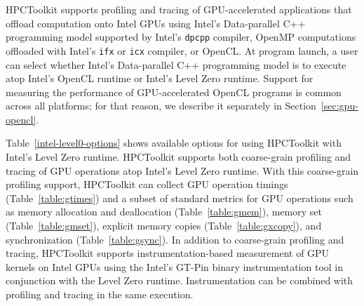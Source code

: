 
HPCToolkit supports profiling and tracing of GPU-accelerated  applications that offload computation onto Intel GPUs using  Intel's Data-parallel C++ programming model supported by Intel's {\tt dpcpp} compiler, OpenMP computations offloaded with Intel's {\tt ifx} or {\tt icx} compiler, or OpenCL. At program launch, a user can select whether Intel's Data-parallel C++ programming model is to execute atop Intel's OpenCL runtime or Intel's Level Zero runtime. Support for measuring the performance of GPU-accelerated OpenCL programs is common across all platforms; for that reason, we describe it separately in Section~\ref{sec:gpu-opencl}.

Table~\ref{intel-level0-options} shows available options for using HPCToolkit with Intel's Level Zero runtime. HPCToolkit supports both coarse-grain profiling and tracing of GPU operations atop Intel's Level Zero runtime. With this coarse-grain profiling support, HPCToolkit can collect GPU operation timings (Table~\ref{table:gtimes}) and a subset of standard metrics for GPU operations such as memory allocation and deallocation (Table~\ref{table:gmem}), memory set (Table~\ref{table:gmset}), explicit memory copies (Table~\ref{table:gxcopy}), and synchronization (Table~\ref{table:gsync}). In addition to coarse-grain profiling and tracing, HPCToolkit supports instrumentation-based measurement of GPU kernels on Intel GPUs using the Intel's GT-Pin binary instrumentation tool in conjunction with the Level Zero runtime. Instrumentation can be combined with profiling and tracing in the same execution. 

